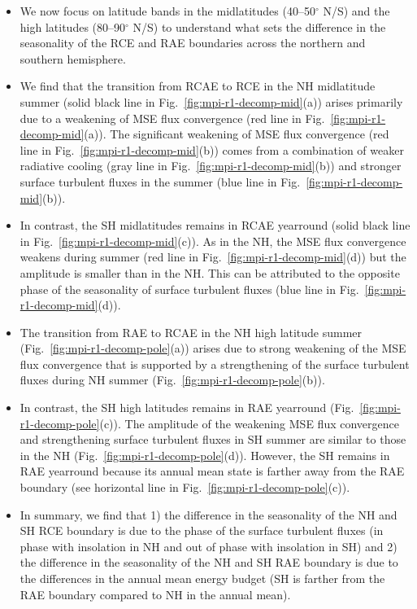 \documentclass{ametsocV5}
\begin{document}
\begin{itemize}
  \item We now focus on latitude bands in the midlatitudes (40--50$^{\circ}$ N/S) and the high latitudes (80--90$^{\circ}$ N/S) to understand what sets the difference in the seasonality of the RCE and RAE boundaries across the northern and southern hemisphere.
  \item We find that the transition from RCAE to RCE in the NH midlatitude summer (solid black line in Fig.~\ref{fig:mpi-r1-decomp-mid}(a)) arises primarily due to a weakening of MSE flux convergence (red line in Fig.~\ref{fig:mpi-r1-decomp-mid}(a)). The significant weakening of MSE flux convergence (red line in Fig.~\ref{fig:mpi-r1-decomp-mid}(b)) comes from a combination of weaker radiative cooling (gray line in Fig.~\ref{fig:mpi-r1-decomp-mid}(b)) and stronger surface turbulent fluxes in the summer (blue line in Fig.~\ref{fig:mpi-r1-decomp-mid}(b)).
  \item In contrast, the SH midlatitudes remains in RCAE yearround (solid black line in Fig.~\ref{fig:mpi-r1-decomp-mid}(c)). As in the NH, the MSE flux convergence weakens during summer (red line in Fig.~\ref{fig:mpi-r1-decomp-mid}(d)) but the amplitude is smaller than in the NH. This can be attributed to the opposite phase of the seasonality of surface turbulent fluxes (blue line in Fig.~\ref{fig:mpi-r1-decomp-mid}(d)).
  \item The transition from RAE to RCAE in the NH high latitude summer (Fig.~\ref{fig:mpi-r1-decomp-pole}(a)) arises due to strong weakening of the MSE flux convergence that is supported by a strengthening of the surface turbulent fluxes during NH summer (Fig.~\ref{fig:mpi-r1-decomp-pole}(b)).
  \item In contrast, the SH high latitudes remains in RAE yearround (Fig.~\ref{fig:mpi-r1-decomp-pole}(c)). The amplitude of the weakening MSE flux convergence and strengthening surface turbulent fluxes in SH summer are similar to those in the NH (Fig.~\ref{fig:mpi-r1-decomp-pole}(d)). However, the SH remains in RAE yearround because its annual mean state is farther away from the RAE boundary (see horizontal line in Fig.~\ref{fig:mpi-r1-decomp-pole}(c)).
  \item In summary, we find that 1) the difference in the seasonality of the NH and SH RCE boundary is due to the phase of the surface turbulent fluxes (in phase with insolation in NH and out of phase with insolation in SH) and 2) the difference in the seasonality of the NH and SH RAE boundary is due to the differences in the annual mean energy budget (SH is farther from the RAE boundary compared to NH in the annual mean).
\end{itemize}
\end{document}
